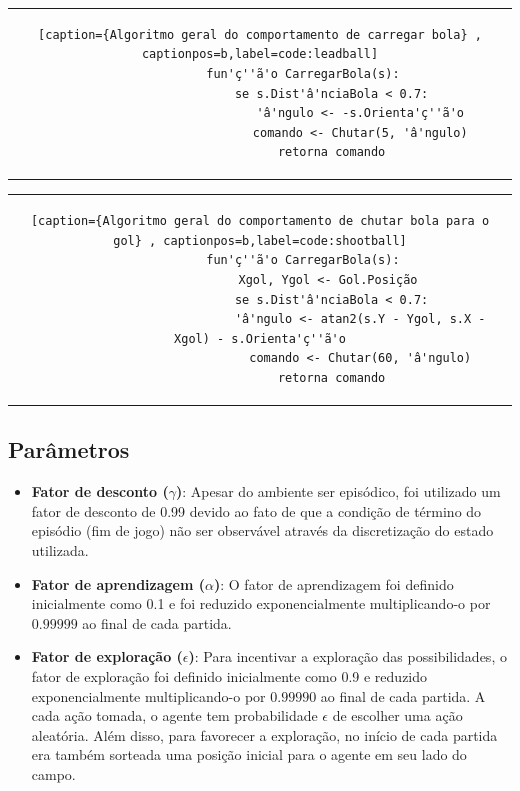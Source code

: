 	\begin{tabular}{c}
		\begin{lstlisting}[caption={Algoritmo geral do comportamento de carregar bola} , captionpos=b,label=code:leadball]
			fun'ç''ã'o CarregarBola(s):
					se s.Dist'â'nciaBola < 0.7:
							'â'ngulo <- -s.Orienta'ç''ã'o
							comando <- Chutar(5, 'â'ngulo)
					retorna comando
		\end{lstlisting}
	\end{tabular}
	
	\begin{tabular}{c}
		\begin{lstlisting}[caption={Algoritmo geral do comportamento de chutar bola para o gol} , captionpos=b,label=code:shootball]
			fun'ç''ã'o CarregarBola(s):
					Xgol, Ygol <- Gol.Posição 
					se s.Dist'â'nciaBola < 0.7:
							'â'ngulo <- atan2(s.Y - Ygol, s.X - Xgol) - s.Orienta'ç''ã'o
							comando <- Chutar(60, 'â'ngulo)
					retorna comando
		\end{lstlisting}
	\end{tabular}



\subsection{Parâmetros}
\label{subsubsec:sarsa-params}

\begin{itemize}
	\item \textbf{Fator de desconto ($\gamma$)}: Apesar do ambiente ser episódico, foi utilizado um fator de desconto de 0.99 devido ao fato de que a condição de término do episódio (fim de jogo) não ser observável através da discretização do estado utilizada.  
	
	\item \textbf{Fator de aprendizagem ($\alpha$)}: O fator de aprendizagem foi definido inicialmente como 0.1 e foi reduzido exponencialmente multiplicando-o por $0.99999$ ao final de cada partida. 
	
	\item \textbf{Fator de exploração ($\epsilon$)}: Para incentivar a exploração das possibilidades, o fator de exploração foi definido inicialmente como 0.9 e reduzido exponencialmente multiplicando-o por $0.99990$ ao final de cada partida. A cada ação tomada, o agente tem probabilidade $\epsilon$ de escolher uma ação aleatória. Além disso, para favorecer a exploração, no início de cada partida era também sorteada uma posição inicial para o agente em seu lado do campo.
\end{itemize}

